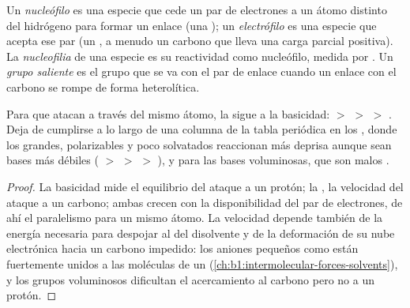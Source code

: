 \begin{definition}\label{def:b1:electronic-effects:nucleophile}
Un \emph{nucleófilo} es una especie que cede un par de
electrones a un átomo distinto del hidrógeno para formar un enlace (una
); un \emph{electrófilo} es una especie que
acepta ese par (un , a menudo un carbono que lleva una
carga parcial positiva). La \emph{nucleofilia} de una
especie es su reactividad como nucleófilo, medida por . Un \emph{grupo saliente} es el grupo que
se va con el par de enlace cuando un enlace con el carbono se rompe de
forma heterolítica.
\end{definition}

\begin{proposition}\label{prop:b1:electronic-effects:nucleophilicity-basicity}
Para  que atacan a través del mismo átomo, la  sigue
a la basicidad:  $>$  $>$  $>$ . Deja
de cumplirse a lo largo de una columna de la tabla periódica en los
, donde los  grandes, polarizables y poco
solvatados reaccionan más deprisa aunque sean bases más débiles
( $>$  $>$  $>$ ), y para las bases
voluminosas, que son malos .
\end{proposition}

\begin{proof}
La basicidad mide el equilibrio del ataque a un protón; la ,
la velocidad del ataque a un carbono; ambas crecen con la disponibilidad
del par de electrones, de ahí el paralelismo para un mismo átomo. La
velocidad depende también de la energía necesaria para despojar al
 del disolvente y de la deformación de su nube electrónica
hacia un carbono impedido: los aniones pequeños como  están
fuertemente unidos a las moléculas de un 
(\cref{ch:b1:intermolecular-forces-solvents}), y los grupos voluminosos
dificultan el acercamiento al carbono pero no a un protón.
\end{proof}

